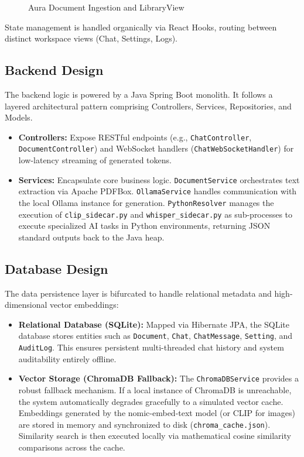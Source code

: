 \begin{figure}[htbp]
\centering
{}
\caption{Aura Document Ingestion and LibraryView}
\label{fig:upload_ui}
\end{figure}

State management is handled organically via React Hooks, routing between distinct workspace views (Chat, Settings, Logs).

\subsection{Backend Design}
The backend logic is powered by a Java Spring Boot monolith. It follows a layered architectural pattern comprising Controllers, Services, Repositories, and Models.
\begin{itemize}
    \item \textbf{Controllers:} Expose RESTful endpoints (e.g., \texttt{ChatController}, \texttt{DocumentController}) and WebSocket handlers (\texttt{ChatWebSocketHandler}) for low-latency streaming of generated tokens.
    \item \textbf{Services:} Encapsulate core business logic. \texttt{DocumentService} orchestrates text extraction via Apache PDFBox. \texttt{OllamaService} handles communication with the local Ollama instance for generation. \texttt{PythonResolver} manages the execution of \texttt{clip\_sidecar.py} and \texttt{whisper\_sidecar.py} as sub-processes to execute specialized AI tasks in Python environments, returning JSON standard outputs back to the Java heap.
\end{itemize}
\subsection{Database Design}
The data persistence layer is bifurcated to handle relational metadata and high-dimensional vector embeddings:
\begin{itemize}
    \item \textbf{Relational Database (SQLite):} Mapped via Hibernate JPA, the SQLite database stores entities such as \texttt{Document}, \texttt{Chat}, \texttt{ChatMessage}, \texttt{Setting}, and \texttt{AuditLog}. This ensures persistent multi-threaded chat history and system auditability entirely offline.
    \item \textbf{Vector Storage (ChromaDB Fallback):} The \texttt{ChromaDBService} provides a robust fallback mechanism. If a local instance of ChromaDB is unreachable, the system automatically degrades gracefully to a simulated vector cache. Embeddings generated by the nomic-embed-text model (or CLIP for images) are stored in memory and synchronized to disk (\texttt{chroma\_cache.json}). Similarity search is then executed locally via mathematical cosine similarity comparisons across the cache.
\end{itemize}

